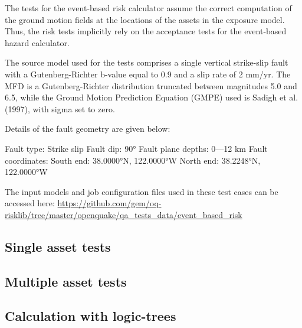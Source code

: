 The tests for the event-based risk calculator assume the correct computation of the ground motion fields at the locations of the assets in the exposure model. Thus, the risk tests implicitly rely on the acceptance tests for the event-based hazard calculator.

The source model used for the tests comprises a single vertical strike-slip fault with a Gutenberg-Richter b-value equal to 0.9 and a slip rate of 2 mm/yr. The MFD is a Gutenberg-Richter distribution truncated between magnitudes 5.0 and 6.5, while the Ground Motion Prediction Equation (GMPE) used is Sadigh et al. (1997), with sigma set to zero.

Details of the fault geometry are given below:

Fault type: Strike slip
Fault dip: 90°
Fault plane depths: 0—12 km
Fault coordinates:
South end: 38.0000°N, 122.0000°W
North end: 38.2248°N, 122.0000°W

The input models and job configuration files used in these test cases can be accessed here:
\href{https://github.com/gem/oq-risklib/tree/master/openquake/qa_tests_data/event_based_risk}
{https://github.com/gem/oq-risklib/tree/master/openquake/qa_tests_data/event_based_risk}

\subsection{Single asset tests}
\label{subsec:eventbased-single}

\subsection{Multiple asset tests}
\label{subsec:eventbased-multiple}

\subsection{Calculation with logic-trees}
\label{subsec:eventbased-logictrees}